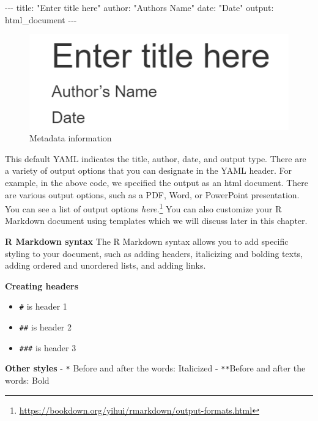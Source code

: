 \documentclass[
  krantz2]{krantz}
\makeatletter
\newenvironment{Shaded}{\begin{snugshade}}{\end{snugshade}}
\newcommand{\NormalTok}[1]{#1}
\newcommand{\SpecialCharTok}[1]{\textcolor[rgb]{0,0,0}{#1}}
\newcommand{\StringTok}[1]{\textcolor[rgb]{0.5,0.5,0.5}{#1}}
\providecommand{\tightlist}{%
  \setlength{\itemsep}{0pt}\setlength{\parskip}{0pt}}
\newenvironment{kframe}{%
\medskip{}
\setlength{\fboxsep}{.8em}
 \def\at@end@of@kframe{}%
 \ifinner\ifhmode%
  \def\at@end@of@kframe{\end{minipage}}%
  \begin{minipage}{\columnwidth}%
 \fi\fi%
 \def\FrameCommand##1{\hskip\@totalleftmargin \hskip-\fboxsep
 \colorbox{shadecolor}{##1}\hskip-\fboxsep
     \hskip-\linewidth \hskip-\@totalleftmargin \hskip\columnwidth}%
 \MakeFramed {\advance\hsize-\width
   \@totalleftmargin\z@ \linewidth\hsize
   \@setminipage}}%
 {\par\unskip\endMakeFramed%
 \at@end@of@kframe}
\renewenvironment{Shaded}{\begin{kframe}}{\end{kframe}}
\makeatother
\begin{document}
\begin{Shaded}
\begin{Highlighting}[]
\SpecialCharTok{{-}{-}{-}}
\NormalTok{title}\SpecialCharTok{:} \StringTok{"Enter title here"}
\NormalTok{author}\SpecialCharTok{:} \StringTok{"Author\textquotesingle{}s Name"}
\NormalTok{date}\SpecialCharTok{:} \StringTok{"Date"}
\NormalTok{output}\SpecialCharTok{:}\NormalTok{ html\_document}
\SpecialCharTok{{-}{-}{-}}
\end{Highlighting}
\end{Shaded}

\begin{figure}
\centering
\includegraphics{images/rmarkdown_1.png}
\caption{Metadata information}
\end{figure}

This default YAML indicates the title, author, date, and output type. There are a variety of output options that you can designate in the YAML header. For example, in the above code, we specified the output as an html document. There are various output options, such as a PDF, Word, or PowerPoint presentation. You can see a list of output options \emph{here.}\footnote{\url{https://bookdown.org/yihui/rmarkdown/output-formats.html}} You can also customize your R Markdown document using templates which we will discuss later in this chapter.

\textbf{R Markdown syntax}
The R Markdown syntax allows you to add specific styling to your document, such as adding headers, italicizing and bolding texts, adding ordered and unordered lists, and adding links.

\textbf{Creating headers}

\begin{itemize}
\tightlist
\item
  \texttt{\#} is header 1
\item
  \texttt{\#\#} is header 2
\item
  \texttt{\#\#\#} is header 3
\end{itemize}

\textbf{Other styles}
- \texttt{*} Before and after the words: Italicized
- \texttt{**}Before and after the words: Bold
\end{document}
